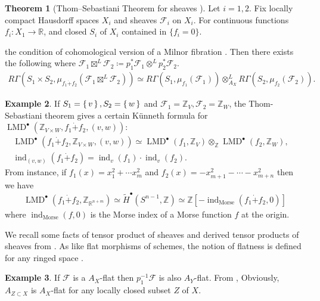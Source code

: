 \documentclass[a4paper,dvipdfmx,reqno,12pt]{amsart}
\theoremstyle{definition}
\newtheorem{theorem}{Theorem}[section]
\newtheorem{example}[theorem]{Example}
\newcommand{\deq}{\coloneqq}
\newcommand{\Z}{\mathbb{Z}}%
\newcommand{\mcal}[1]{\mathcal{#1}}%
\newcommand{\opn}[1]{\operatorname{#1}}
\numberwithin{equation}{section}
\begin{document}
\begin{theorem}[{Thom--Sebastiani Theorem for sheaves \cite[Theorem 1.2.2]{MR2031639}}]
Let $i=1,2$.
Fix locally compact Hausdorff spaces $X_i$ and 
sheaves $\mathcal{F}_i$ on $X_i$.
For continuous functions $f_i\colon X_1 \to\mathbb{R}$,
and closed $S_i$ of $X_i$ contained in $\{f_i=0\}$.

the condition of cohomological version of a Milnor 
fibration \cite[Assumption 1.1.1]{MR2031639}.
Then there exists the following
where $\mcal{F}_1\boxtimes^{L} \mcal{F}_2\deq p_1^{*}\mcal{F}_1\otimes^{L}p^{*}_2\mcal{F}_2$.
  \begin{align}
    R\Gamma(S_1\times S_2,\mu_{f_1\dot{+}f_2}(\mcal{F}_1\boxtimes^{L} \mcal{F}_2))
    \simeq R\Gamma(S_1,\mu_{f_1}(\mcal{F}_1))
    \otimes^{L}_{A_X}R\Gamma(S_2,\mu_{f_2}(\mcal{F}_2)).
  \end{align}

\end{theorem}


\begin{example}
  If $S_1=\set{v},S_2=\set{w}$ and $\mcal{F}_1=\Z_V, \mcal{F}_2=\Z_{W}$,
  the Thom-Sebastiani theorem gives
  a certain K\"unneth formula for
  $\opn{LMD}^{\bullet}(\Z_{V\times W},f_1\dot{+}f_2,(v,w))$:
\begin{align}
\opn{LMD}^{\bullet}(f_1\dot{+}f_2,\Z_{V\times W},(v,w))
\simeq \opn{LMD}^{\bullet}(f_1,\Z_{V})
\otimes_{\Z} \opn{LMD}^{\bullet}(f_2,\Z_{W}), \quad \\
\opn{ind}_{(v,w)}(f_1\dot{+}f_2)=\opn{ind}_v(f_1)\cdot \opn{ind}_v(f_2).
\end{align}
  From instance, if $f_1(x)=x_1^{2}+\cdots x_{m}^{2}$
  and $f_2(x)=-x_{m+1}^{2}-\cdots - x_{m+n}^{2}$ then we have
\begin{align}
    \opn{LMD}^{\bullet}(f_1\dot{+}f_2,\Z_{{\mathbb{R}}^{n+m}})
    \simeq \tilde{H}^{\bullet}(S^{n-1},\Z)
    \simeq \Z[-\opn{ind}_{\mathrm{Morse}}(f_1\dot{+}f_2,0)]
\end{align}
  where $\opn{ind}_{\mathrm{Morse}}(f,0)$ is the Morse index
  of a Morse function $f$ at the origin.
\end{example}

We recall some facts of tensor product of sheaves 
and derived tensor products of sheaves from \cite{MR1299726}.
As like flat morphisms of schemes, the notion of flatness
is defined for any ringed space 
\cite[Definition 2.4.11]{MR1299726}.

\begin{example}

If $\mcal{F}$ is a $A_X$-flat then $p_1^{-1}\mcal{F}$ is also 
$A_Y$-flat. From \cite[(2.2.7)]{}, 
Obviously, $A_{Z\subset X}$ is $A_X$-flat for any locally 
closed subset $Z$ of $X$. 
\end{example}
\end{document}
